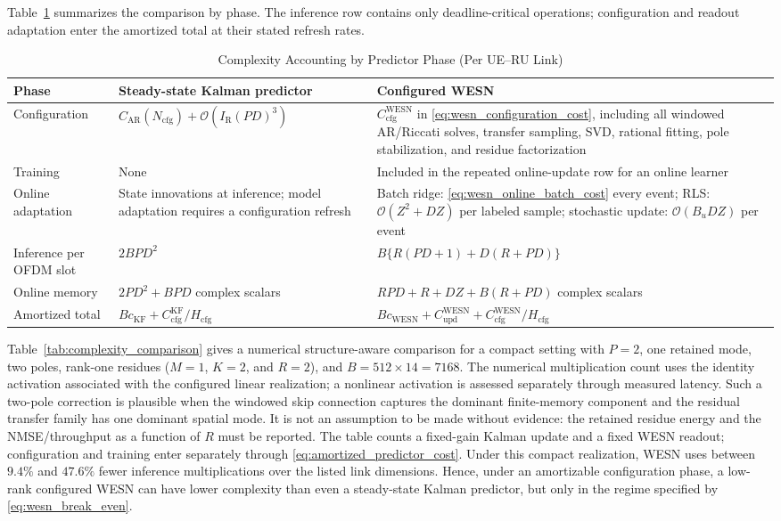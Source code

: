 \documentclass[lettersize,journal]{IEEEtran}
\begin{document}
Table~\ref{tab:phase_complexity_summary} summarizes the comparison by phase.
The inference row contains only deadline-critical operations; configuration
and readout adaptation enter the amortized total at their stated refresh
rates.

\begin{table}[t]
\centering
\caption{Complexity Accounting by Predictor Phase (Per UE--RU Link)}
\label{tab:phase_complexity_summary}
\begin{tabularx}{\textwidth}{l X X}
\toprule
Phase & Steady-state Kalman predictor & Configured WESN\\
\midrule
Configuration
& $C_{\mathrm{AR}}(N_{\mathrm{cfg}})+\mathcal{O}(I_{\mathrm{R}}(PD)^3)$
& $C_{\mathrm{cfg}}^{\mathrm{WESN}}$ in \eqref{eq:wesn_configuration_cost}, including all windowed AR/Riccati solves, transfer sampling, SVD, rational fitting, pole stabilization, and residue factorization\\
Training
& None
& Included in the repeated online-update row for an online learner\\
Online adaptation
& State innovations at inference; model adaptation requires a configuration refresh
& Batch ridge: \eqref{eq:wesn_online_batch_cost} every event; RLS: $\mathcal{O}(Z^2+DZ)$ per labeled sample; stochastic update: $\mathcal{O}(B_uDZ)$ per event\\
Inference per OFDM slot
& $2BPD^2$
& $B\{R(PD+1)+D(R+PD)\}$\\
Online memory
& $2PD^2+BPD$ complex scalars
& $RPD+R+DZ+B(R+PD)$ complex scalars\\
Amortized total
& $Bc_{\mathrm{KF}}+C_{\mathrm{cfg}}^{\mathrm{KF}}/H_{\mathrm{cfg}}$
& $Bc_{\mathrm{WESN}}+C_{\mathrm{upd}}^{\mathrm{WESN}}+C_{\mathrm{cfg}}^{\mathrm{WESN}}/H_{\mathrm{cfg}}$\\
\bottomrule
\end{tabularx}
\end{table}

Table~\ref{tab:complexity_comparison} gives a numerical structure-aware
comparison for a compact setting with $P=2$, one retained mode, two poles,
rank-one residues ($M=1$, $K=2$, and $R=2$), and
$B=512\times14=7168$.  The numerical multiplication count uses the identity
activation associated with the configured linear realization; a nonlinear
activation is assessed separately through measured latency.  Such a two-pole correction is plausible when the
windowed skip connection captures the dominant finite-memory component and
the residual transfer family has one dominant spatial mode.  It is not an
assumption to be made without evidence: the retained residue energy and the
NMSE/throughput as a function of $R$ must be reported.  The table counts a
fixed-gain Kalman update and a fixed WESN readout; configuration and training
enter separately through \eqref{eq:amortized_predictor_cost}.  Under this
compact realization, WESN uses between $9.4\%$ and $47.6\%$ fewer inference
multiplications over the listed link dimensions.  Hence, under an amortizable
configuration phase, a low-rank configured WESN can have lower complexity
than even a steady-state Kalman predictor, but only in the regime specified
by \eqref{eq:wesn_break_even}.
\end{document}

